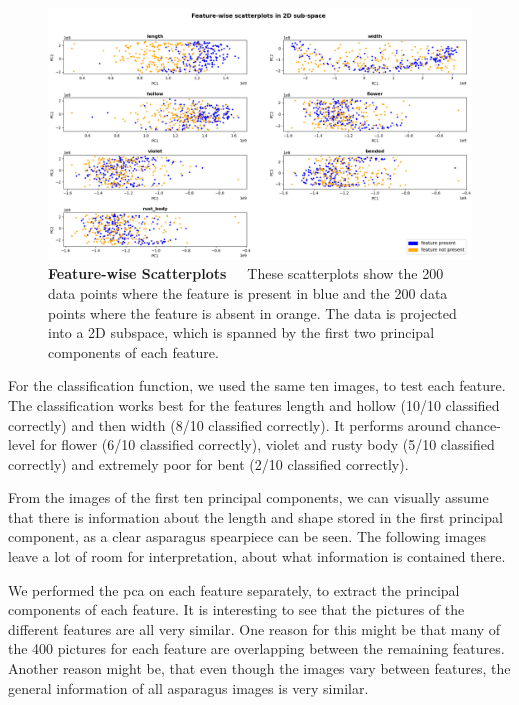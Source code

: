 \begin{figure}[h]
	\centering
	\includegraphics[scale=0.35]{Figures/chapter04/pca_scatterplot.png}
	\decoRule
	\caption[Feature-wise Scatterplots]{\textbf{Feature-wise Scatterplots}~~~These scatterplots show the 200 data points where the feature is present in blue and the 200 data points where the feature is absent in orange. The data is projected into a 2D subspace, which is spanned by the first two principal components of each feature.}
	\label{fig:PCAscatter}
\end{figure}

For the classification function, we used the same ten images, to test each feature. The classification works best for the features length and hollow (10/10 classified correctly) and then width (8/10 classified correctly). It performs around chance-level for flower (6/10 classified correctly), violet and rusty body (5/10 classified correctly) and extremely poor for bent (2/10 classified correctly).   

From the images of the first ten principal components, we can visually assume that there is information about the length and shape stored in the first principal component, as a clear asparagus spearpiece can be seen. The following images leave a lot of room for interpretation, about what information is contained there.

We performed the \acrshort{pca} on each feature separately, to extract the principal components of each feature. It is interesting to see that the pictures of the different features are all very similar. One reason for this might be that many of the 400 pictures for each feature are overlapping between the remaining features. Another reason might be, that even though the images vary between features, the general information of all asparagus images is very similar.

